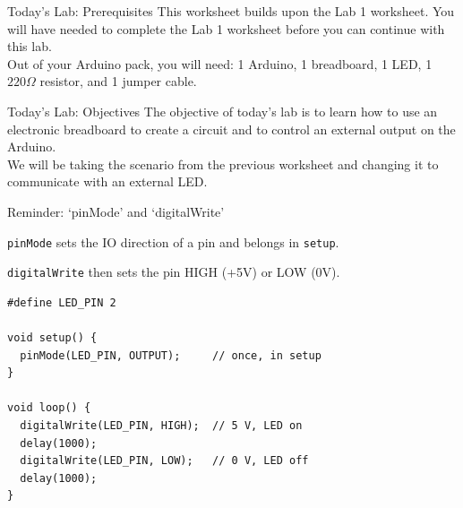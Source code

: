 \documentclass[aspectratio=169]{beamer}
\begin{document}
\begin{frame}{Today's Lab: Prerequisites}
    \Large
    This worksheet builds upon the Lab 1 worksheet. You will have needed to complete the Lab 1 worksheet before you can continue with this lab.\\
    
    Out of your Arduino pack, you will need: 1 Arduino, 1 breadboard, 1 LED, 1 $220\Omega$ resistor, and 1 jumper cable.
\end{frame}

\begin{frame}{Today's Lab: Objectives}
    \Large
    The objective of today's lab is to learn how to use an electronic breadboard to create a circuit and to control an external output on the Arduino.\\

    We will be taking the scenario from the previous worksheet and changing it to communicate with an external LED.
\end{frame}

\begin{frame}[fragile]{Reminder: `pinMode' and `digitalWrite'}
    \normalsize
    
    \verb|pinMode| sets the IO direction of a pin and belongs in \verb|setup|. 
    
    \vspace{.5em}

    \verb|digitalWrite| then sets the pin HIGH (+5V) or LOW (0V).
    
    \vspace{.5em}
    
\begin{verbatim}
#define LED_PIN 2

void setup() {
  pinMode(LED_PIN, OUTPUT);     // once, in setup
}

void loop() {
  digitalWrite(LED_PIN, HIGH);  // 5 V, LED on
  delay(1000);
  digitalWrite(LED_PIN, LOW);   // 0 V, LED off
  delay(1000);
}
\end{verbatim}
\end{frame}
\end{document}
